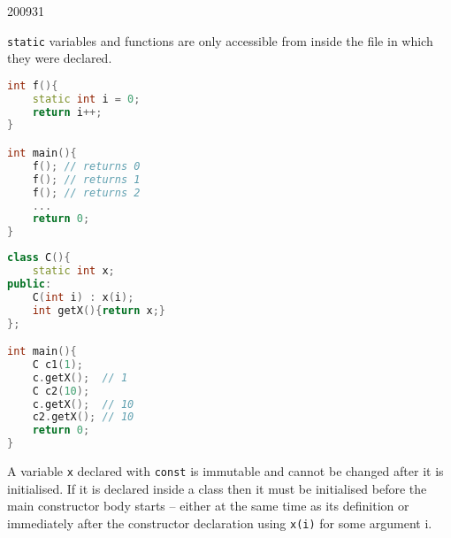 \documentclass[10pt,\jkfside,a4paper]{article}
\begin{document}
\begin{examquestion}{2009}{3}{1}
\begin{enumerate}[label=(\alph*)]
\texttt{static} variables and functions are only accessible from inside the
file in which they were declared.

\begin{lstlisting}[language=C++]
int f(){
	static int i = 0;
	return i++;
}

int main(){
	f(); // returns 0
	f(); // returns 1
	f(); // returns 2
	...
	return 0;
}
\end{lstlisting}

\begin{lstlisting}[language=C++]
class C(){
	static int x;
public:
	C(int i) : x(i);
	int getX(){return x;}
};

int main(){
	C c1(1);
	c.getX();  // 1
	C c2(10);
	c.getX();  // 10
	c2.getX(); // 10
	return 0;
}

\end{lstlisting}

A variable \texttt{x} declared with \texttt{const} is immutable and cannot be
changed after it is initialised. If it is declared inside a class then it
must be initialised before the main constructor body starts -- either at the
same time as its definition or immediately after the constructor
declaration using \texttt{x(i)} for some argument i.

\end{enumerate}

\end{examquestion}
\end{document}
